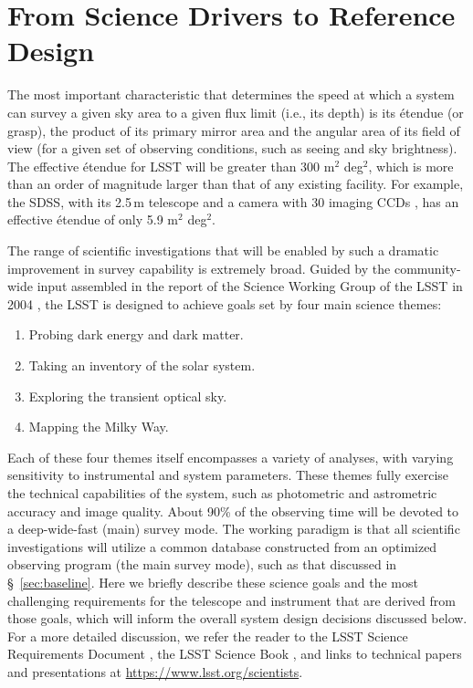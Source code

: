 \section{From Science Drivers to Reference Design}
\label{Sec:refdesign}

The most important characteristic that determines the speed at which a system can
survey a given sky area to a given flux limit (i.e., its depth) is its \'etendue
(or grasp), the product of its primary mirror area and the angular
area of its field of view (for a given set of observing conditions, such as
seeing and sky brightness).
The effective \'etendue for LSST will be greater than 300 m$^2$ deg$^2$, which
is more than an order of magnitude larger than that of any existing facility.
For example, the SDSS, with its 2.5\,m telescope \citep{2006AJ....131.2332G} and a
camera with 30 imaging CCDs \citep{1998AJ....116.3040G}, has an effective \'etendue of
only 5.9 m$^2$ deg$^2$.

The range of scientific investigations that will be enabled by such a
dramatic improvement in survey capability is extremely broad. Guided by
the community-wide input assembled in the report of the Science Working Group of the
LSST in 2004 \citep{Document-26952}, the LSST is designed to
achieve goals set by four main science themes:

\begin{enumerate}
\item Probing dark energy and dark matter.
\item Taking an inventory of the solar system.
\item Exploring the transient optical sky.
\item Mapping the Milky Way.
\end{enumerate}

Each of these four themes itself encompasses a variety of analyses, with
varying sensitivity to instrumental and system parameters. These themes
fully exercise the technical capabilities of the system, such as photometric
and astrometric accuracy and image quality. About 90\% of the observing time
will be devoted to a deep-wide-fast (main) survey mode. The working paradigm is that all
scientific investigations will utilize a common database constructed from an optimized
observing program (the main survey mode), such as that discussed in
\S~\ref{sec:baseline}.
Here we briefly describe these science goals and the most challenging requirements for the
telescope and instrument that are derived from those goals, which will
inform the overall system design decisions discussed below.
For a more detailed discussion, we refer the reader to the LSST Science Requirements
Document \citep[SRD;][]{LPM-17}, the LSST Science Book
\citep[][hereafter SciBook]{2009arXiv0912.0201L},
and links to technical papers and presentations at
\url{https://www.lsst.org/scientists}.


